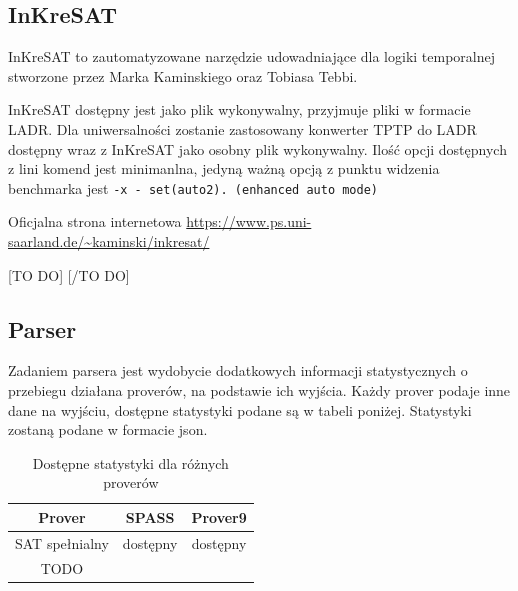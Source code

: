 \documentclass[a4paper,12pt]{article}
\newenvironment{longlisting}{\captionsetup{type=listing}}{}
\begin{document}
\subsection{InKreSAT}

InKreSAT to zautomatyzowane narzędzie udowadniające dla logiki temporalnej stworzone przez Marka Kaminskiego oraz Tobiasa Tebbi.

InKreSAT dostępny jest jako plik wykonywalny, przyjmuje pliki w formacie \gls{LADR}. Dla uniwersalności zostanie zastosowany konwerter TPTP do LADR dostępny wraz z InKreSAT jako osobny plik wykonywalny. Ilość opcji dostępnych z lini komend jest minimanlna, jedyną ważną opcją z punktu widzenia benchmarka jest \texttt{-x - set(auto2).  (enhanced auto mode)}

\noindent
Oficjalna strona internetowa \url{https://www.ps.uni-saarland.de/~kaminski/inkresat/}


[TO DO]
%
[/TO DO]

\subsection{Parser} \label{parser}

Zadaniem parsera jest wydobycie dodatkowych informacji statystycznych o przebiegu działana proverów, na podstawie ich wyjścia.
\newline
Każdy prover podaje inne dane na wyjściu, dostępne statystyki podane są w tabeli poniżej.
\newline
Statystyki zostaną podane w formacie json.

\begin{table}[ht]
  \centering
  \caption{Dostępne statystyki dla różnych proverów}
  \begin{tabular}{ |c|c|c| }
    \hline
    Prover & SPASS & Prover9 \\
    \hline
    SAT spełnialny & dostępny & dostępny \\
    \hline
    TODO & & \\
    \hline
  \end{tabular}
\end{table}
\end{document}
